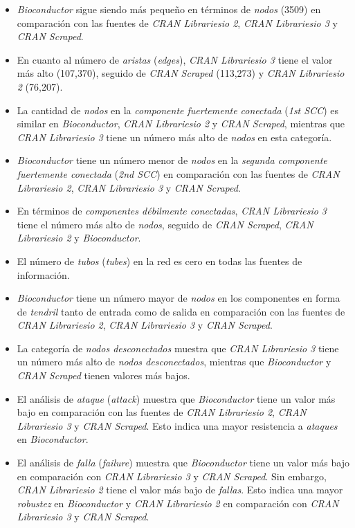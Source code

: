 \begin{itemize}
    \item \textit{Bioconductor} sigue siendo más pequeño en términos de \textit{nodos} (3509)
          en comparación con las fuentes de \textit{CRAN Librariesio 2}, \textit{CRAN Librariesio 3}
          y \textit{CRAN Scraped}.
    \item En cuanto al número de \textit{aristas} (\textit{edges}), \textit{CRAN Librariesio 3}
          tiene el valor más alto (107,370), seguido de \textit{CRAN Scraped} (113,273) y
          \textit{CRAN Librariesio 2} (76,207).
    \item La cantidad de \textit{nodos} en la \textit{componente fuertemente conectada}
          (\textit{1st SCC}) es similar en \textit{Bioconductor}, \textit{CRAN Librariesio 2} y
          \textit{CRAN Scraped}, mientras que \textit{CRAN Librariesio 3} tiene un número más alto
          de \textit{nodos} en esta categoría.
    \item \textit{Bioconductor} tiene un número menor de \textit{nodos} en la
          \textit{segunda componente fuertemente conectada} (\textit{2nd SCC}) en comparación con
          las fuentes de \textit{CRAN Librariesio 2}, \textit{CRAN Librariesio 3} y
          \textit{CRAN Scraped}.
    \item En términos de \textit{componentes débilmente conectadas},
          \textit{CRAN Librariesio 3} tiene el número más alto de \textit{nodos}, seguido
          de \textit{CRAN Scraped}, \textit{CRAN Librariesio 2} y \textit{Bioconductor}.
    \item El número de \textit{tubos} (\textit{tubes}) en la red es cero en todas las fuentes
          de información.
    \item \textit{Bioconductor} tiene un número mayor de \textit{nodos} en los componentes en
          forma de \textit{tendril} tanto de entrada como de salida en comparación con las fuentes
          de \textit{CRAN Librariesio 2}, \textit{CRAN Librariesio 3} y \textit{CRAN Scraped}.
    \item La categoría de \textit{nodos desconectados} muestra que \textit{CRAN Librariesio 3} tiene un número más alto de \textit{nodos desconectados}, mientras que \textit{Bioconductor} y \textit{CRAN Scraped} tienen valores más bajos.
    \item El análisis de \textit{ataque} (\textit{attack}) muestra que \textit{Bioconductor} tiene un valor más bajo en comparación con las fuentes de \textit{CRAN Librariesio 2}, \textit{CRAN Librariesio 3} y \textit{CRAN Scraped}. Esto indica una mayor resistencia a \textit{ataques} en \textit{Bioconductor}.
    \item El análisis de \textit{falla} (\textit{failure}) muestra que \textit{Bioconductor} tiene un valor más bajo en comparación con \textit{CRAN Librariesio 3} y \textit{CRAN Scraped}. Sin embargo, \textit{CRAN Librariesio 2} tiene el valor más bajo de \textit{fallas}. Esto indica una mayor \textit{robustez} en \textit{Bioconductor} y \textit{CRAN Librariesio 2} en comparación con \textit{CRAN Librariesio 3} y \textit{CRAN Scraped}.
\end{itemize}

